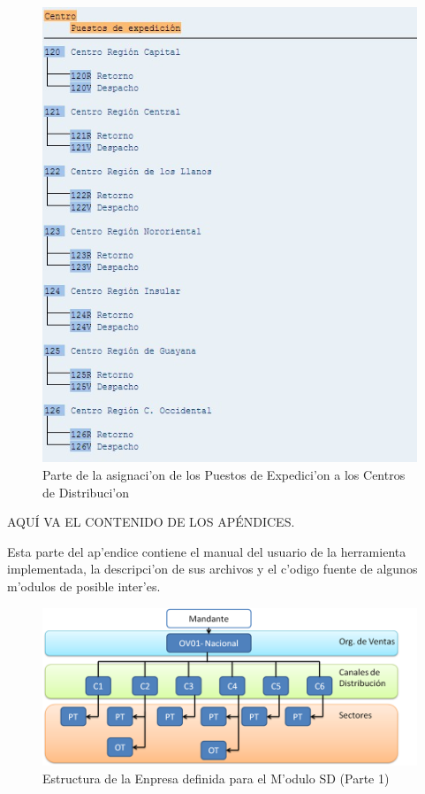 \begin{figure}[htb]
\centering
\includegraphics[scale=0.65,type=jpg,ext=.jpg,read=.jpg]{figures/ExpedicionCentro}
\caption{Parte de la asignaci'on de los Puestos de Expedici'on a los Centros de Distribuci'on}
\label{fig:asigna6}
\end{figure}

AQU\'I VA EL CONTENIDO DE LOS AP\'ENDICES.
\vspace{5 mm}

Esta parte del ap'endice contiene el manual del usuario de la herramienta
implementada, la descripci'on de sus archivos y el c'odigo fuente de algunos
m'odulos de posible inter'es.

\begin{figure}[htb]
\centering
\includegraphics[scale=0.45,type=png,ext=.png,read=.png]{figures/Org1}
\caption{Estructura de la Enpresa definida para el M'odulo SD (Parte 1)}
\label{fig:estructura}
\end{figure}

